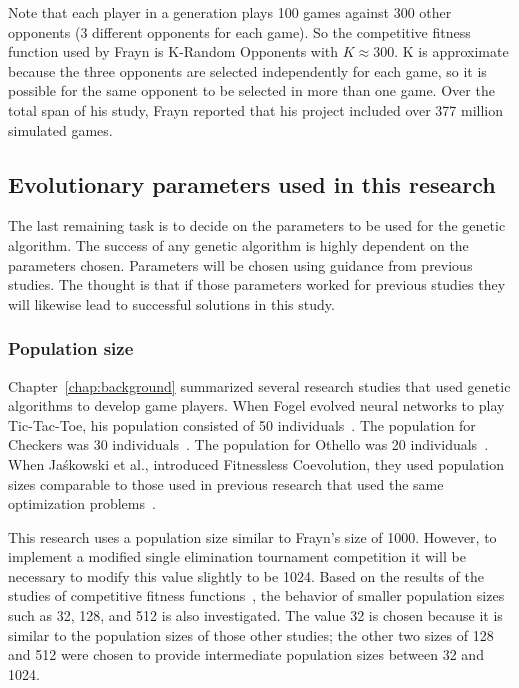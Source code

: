 Note that each player in a generation plays 100 games against 300 other
opponents (3 different opponents for each game). So the competitive fitness
function used by Frayn is K-Random Opponents with \(K\approx300\). K is
approximate because the three opponents are selected independently for each
game, so it is possible for the same opponent to be selected in more than one
game. Over the total span of his study, Frayn reported that his project
included over 377 million simulated games.

\subsection{Evolutionary parameters used in this research}

The last remaining task is to decide on the parameters to be used for the
genetic algorithm. The success of any genetic algorithm is highly dependent on
the parameters chosen. Parameters will be chosen using guidance from previous
studies. The thought is that if those parameters worked for previous studies
they will likewise lead to successful solutions in this study.

\subsubsection{Population size}

Chapter~\ref{chap:background} summarized several research studies that used
genetic algorithms to develop game players. When Fogel evolved neural networks
to play Tic-Tac-Toe, his population consisted of 50
individuals~\cite{Fogel1993}. The population for Checkers was 30
individuals~\cite{Fogel2000Anaconda,journals/tec/ChellapillaF01}.
The population for Othello was 20 individuals~\cite{ChongTW05}. When
Ja\'{s}kowski et al., introduced Fitnessless Coevolution, they used population
sizes comparable to those used in previous research that used the same
optimization problems~\cite{Jaskowski:2008:FC:1389095.1389161}.

This research uses a population size similar to Frayn's size of
1000. However, to implement a modified single elimination tournament competition
it will be necessary to modify this value slightly to be 1024. Based on the 
results of the studies of competitive fitness
functions~\cite{Angeline:1993:CEE:645513.657590, Panait02acomparative,
Jaskowski:2008:FC:1389095.1389161}, the behavior of smaller
population sizes such as 32, 128, and 512 is also investigated. 
The value 32 is chosen because it is
similar to the population sizes of those other studies; the other two sizes of
128 and 512 were chosen to provide intermediate population sizes between 32 and
1024.

